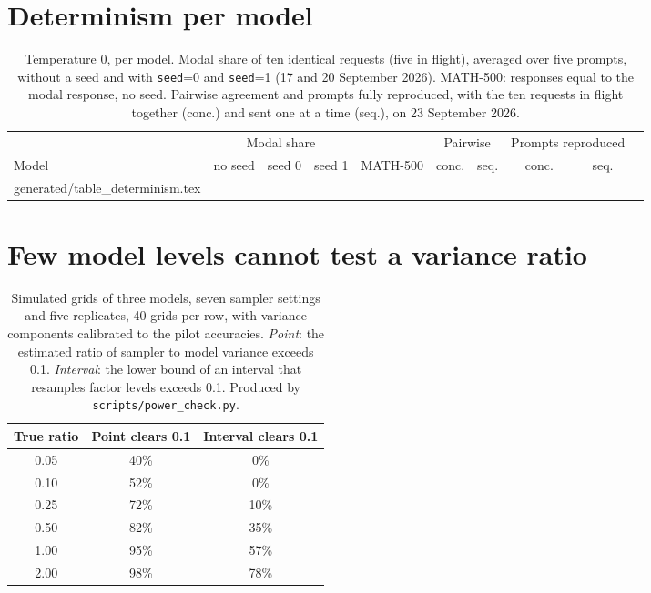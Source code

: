 \documentclass[10pt]{article}
\makeatletter
\newcommand{\p}[1]{\texttt{#1}}
\newcommand{\inputrows}[1]{\@@input #1 }
\makeatother
\begin{document}
\section{Determinism per model}
\label{app:determinism}

\begin{table}[H]
\centering
\small
\caption{Temperature 0, per model. Modal share of ten identical requests (five in flight), averaged over five prompts, without a seed and with \p{seed}=0 and \p{seed}=1 (17 and 20 September 2026). MATH-500: responses equal to the modal response, no seed. Pairwise agreement and prompts fully reproduced, with the ten requests in flight together (conc.) and sent one at a time (seq.), on 23 September 2026.}
\label{tab:determinism}
\setlength{\tabcolsep}{4.5pt}
\begin{tabular}{lccccccccc}
\toprule
 & \multicolumn{3}{c}{Modal share} & & \multicolumn{2}{c}{Pairwise} & \multicolumn{2}{c}{Prompts reproduced} \\
\cmidrule(lr){2-4}\cmidrule(lr){6-7}\cmidrule(lr){8-9}
Model & no seed & seed 0 & seed 1 & MATH-500 & conc. & seq. & conc. & seq. \\
\midrule
\inputrows{generated/table_determinism.tex}
\bottomrule
\end{tabular}
\end{table}

\section{Few model levels cannot test a variance ratio}
\label{app:levels}

\begin{table}[H]
\centering
\small
\caption{Simulated grids of three models, seven sampler settings and five replicates, 40 grids per row, with variance components calibrated to the pilot accuracies. \emph{Point}: the estimated ratio of sampler to model variance exceeds 0.1. \emph{Interval}: the lower bound of an interval that resamples factor levels exceeds 0.1. Produced by \texttt{scripts/power\_check.py}.}
\label{tab:levels}
\begin{tabular}{ccc}
\toprule
True ratio & Point clears 0.1 & Interval clears 0.1 \\
\midrule
0.05 & 40\% & 0\% \\
0.10 & 52\% & 0\% \\
0.25 & 72\% & 10\% \\
0.50 & 82\% & 35\% \\
1.00 & 95\% & 57\% \\
2.00 & 98\% & 78\% \\
\bottomrule
\end{tabular}
\end{table}
\end{document}
